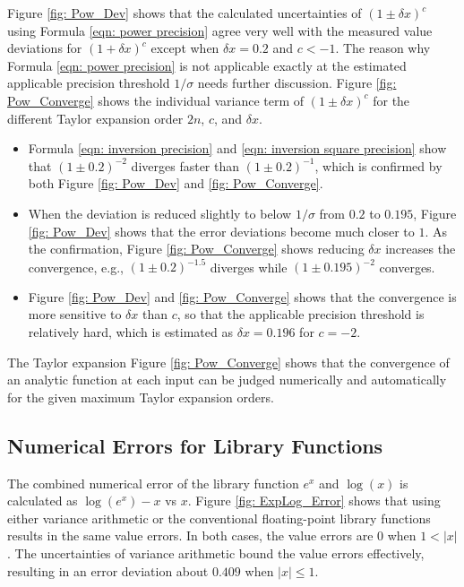 \documentclass[twoside]{article}
\numberwithin{equation}{section}
\begin{document}
Figure \ref{fig: Pow_Dev} shows that the calculated uncertainties of $(1 \pm \delta x)^c$ using Formula \eqref{eqn: power precision} agree very well with the measured value deviations for $(1 + \delta x)^c$ except when $\delta x =0.2$ and $c < -1$.
The reason why Formula \eqref{eqn: power precision} is not applicable exactly at the estimated applicable precision threshold $1/\sigma$ needs further discussion.
Figure \ref{fig: Pow_Converge} shows the individual variance term of $(1 \pm \delta x)^c$ for the different Taylor expansion order $2n$, $c$, and $\delta x$.
\begin{itemize}

\item Formula \eqref{eqn: inversion precision} and \eqref{eqn: inversion square precision} show that $(1 \pm 0.2)^{-2}$ diverges faster than $(1 \pm 0.2)^{-1}$, which is confirmed by both Figure \ref{fig: Pow_Dev} and \ref{fig: Pow_Converge}.

\item 
When the deviation is reduced slightly to below $1/\sigma$ from $0.2$ to $0.195$, Figure \ref{fig: Pow_Dev} shows that the error deviations become much closer to $1$.  
As the confirmation, Figure \ref{fig: Pow_Converge} shows reducing $\delta x$ increases the convergence, e.g., $(1 \pm 0.2)^{-1.5}$ diverges while $(1 \pm 0.195)^{-2}$ converges.

\item Figure \ref{fig: Pow_Dev} and \ref{fig: Pow_Converge} shows that the convergence is more sensitive to $\delta x$ than $c$, so that the applicable precision threshold is relatively hard, which is estimated as $\delta x = 0.196$ for $c=-2$.

\end{itemize}
The Taylor expansion 
Figure \ref{fig: Pow_Converge} shows that the convergence of an analytic function at each input can be judged numerically and automatically for the given maximum Taylor expansion orders.



\subsection{Numerical Errors for Library Functions}

The combined numerical error of the library function $e^x$ and $\log(x)$ is calculated as $\log(e^x) - x$ vs $x$.
Figure \ref{fig: ExpLog_Error} shows that using either variance arithmetic or the conventional floating-point library functions results in the same value errors.  
In both cases, the value errors are $0$ when $1 < |x|$.
The uncertainties of variance arithmetic bound the value errors effectively, resulting in an error deviation about $0.409$ when $|x| \leq 1$.
\end{document}
